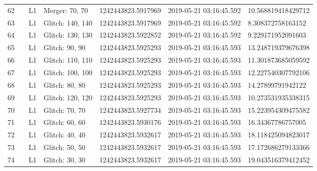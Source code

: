 \begin{longtable}{lllllll}
62   &                                                    &       L1 &    Merger: 70, 70 &  1242443823.5917969 &  2019-05-21 03:16:45.592 &  10.568819418429712 \\
63   &                                                    &       L1 &  Glitch: 140, 140 &  1242443823.5917969 &  2019-05-21 03:16:45.592 &   8.308372758163152 \\
64   &                                                    &       L1 &  Glitch: 130, 130 &  1242443823.5922852 &  2019-05-21 03:16:45.592 &   9.229171952091603 \\
65   &                                                    &       L1 &    Glitch: 90, 90 &  1242443823.5925293 &  2019-05-21 03:16:45.593 &  13.248719379676398 \\
66   &                                                    &       L1 &  Glitch: 110, 110 &  1242443823.5925293 &  2019-05-21 03:16:45.593 &  11.301873685059592 \\
67   &                                                    &       L1 &  Glitch: 100, 100 &  1242443823.5925293 &  2019-05-21 03:16:45.593 &  12.227540307792106 \\
68   &                                                    &       L1 &    Glitch: 80, 80 &  1242443823.5925293 &  2019-05-21 03:16:45.593 &   14.27899791942122 \\
69   &                                                    &       L1 &  Glitch: 120, 120 &  1242443823.5925293 &  2019-05-21 03:16:45.593 &  10.273531935338315 \\
70   &                                                    &       L1 &    Glitch: 70, 70 &  1242443823.5927734 &  2019-05-21 03:16:45.593 &  15.223954309475582 \\
71   &                                                    &       L1 &    Glitch: 60, 60 &  1242443823.5930176 &  2019-05-21 03:16:45.593 &   16.34367786757005 \\
72   &                                                    &       L1 &    Glitch: 40, 40 &  1242443823.5932617 &  2019-05-21 03:16:45.593 &  18.118425094823017 \\
73   &                                                    &       L1 &    Glitch: 50, 50 &  1242443823.5932617 &  2019-05-21 03:16:45.593 &  17.172686279133366 \\
74   &                                                    &       L1 &    Glitch: 30, 30 &  1242443823.5932617 &  2019-05-21 03:16:45.593 &  19.043516379412452 \\

\end{longtable}
